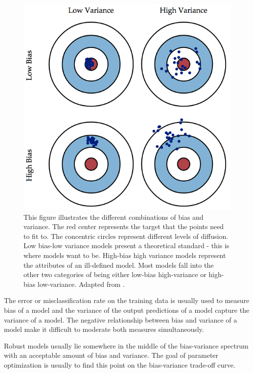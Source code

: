 \begin{figure}[ht]
\begin{center}
\includegraphics[scale=0.5]{images/biasvariance.png}
\caption[Bias-Variance Depiction]{This figure illustrates the different combinations of bias and variance. The red  center represents the target that the points need to fit to. The concentric circles represent different levels of diffusion. Low bias-low variance models present a theoretical standard - this is where models want to be. High-bias high variance models represent the attributes of an ill-defined model. Most models fall into the other two categories of being either low-bias high-variance or high-bias low-variance. Adapted from \cite{tradeoff}.}
\end{center}
\end{figure}

The error or misclassification rate on the training data is usually used to measure bias of a model and the variance of the output predictions of a model capture the variance of a model. The negative relationship between bias and variance of a model make it difficult to moderate both measures simultaneously. 

Robust models usually lie somewhere in the middle of the bias-variance spectrum with an acceptable amount of bias and variance. The goal of parameter optimization is usually to find this point on the bias-variance trade-off curve.

